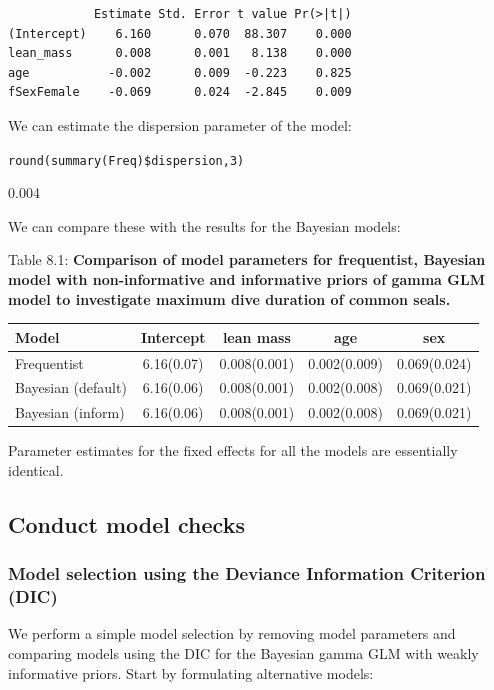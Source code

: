 \documentclass[
]{book}
\begin{document}
\begin{verbatim}
            Estimate Std. Error t value Pr(>|t|)
(Intercept)    6.160      0.070  88.307    0.000
lean_mass      0.008      0.001   8.138    0.000
age           -0.002      0.009  -0.223    0.825
fSexFemale    -0.069      0.024  -2.845    0.009
\end{verbatim}

We can estimate the dispersion parameter of the model:

\texttt{round(summary(Freq)\$dispersion,3)}

0.004

We can compare these with the results for the Bayesian models:

Table 8.1: \textbf{Comparison of model parameters for frequentist, Bayesian model with non-informative and informative priors of gamma GLM model to investigate maximum dive duration of common seals.}

\begin{longtable}[]{@{}lcccc@{}}
\toprule
Model & Intercept & lean mass & age & sex \\
\midrule
\endhead
Frequentist & 6.16(0.07) & 0.008(0.001) & 0.002(0.009) & 0.069(0.024) \\
Bayesian (default) & 6.16(0.06) & 0.008(0.001) & 0.002(0.008) & 0.069(0.021) \\
Bayesian (inform) & 6.16(0.06) & 0.008(0.001) & 0.002(0.008) & 0.069(0.021) \\
\bottomrule
\end{longtable}

Parameter estimates for the fixed effects for all the models are essentially identical.

\hypertarget{conduct-model-checks-4}{%
\subsection{Conduct model checks}\label{conduct-model-checks-4}}

\hypertarget{gamma-dic}{%
\subsubsection{Model selection using the Deviance Information Criterion (DIC)}\label{gamma-dic}}

We perform a simple model selection by removing model parameters and comparing models using the DIC for the Bayesian gamma GLM with weakly informative priors. Start by formulating alternative models:
\end{document}
